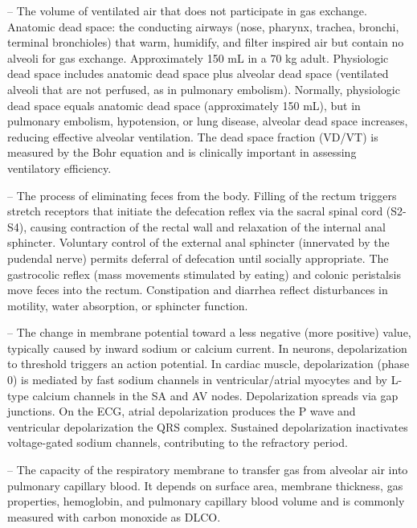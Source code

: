 -- The volume of ventilated air that does not participate in gas exchange. Anatomic dead space: the conducting airways (nose, pharynx, trachea, bronchi, terminal bronchioles) that warm, humidify, and filter inspired air but contain no alveoli for gas exchange. Approximately 150 mL in a 70 kg adult. Physiologic dead space includes anatomic dead space plus alveolar dead space (ventilated alveoli that are not perfused, as in pulmonary embolism). Normally, physiologic dead space equals anatomic dead space (approximately 150 mL), but in pulmonary embolism, hypotension, or lung disease, alveolar dead space increases, reducing effective alveolar ventilation. The dead space fraction (VD/VT) is measured by the Bohr equation and is clinically important in assessing ventilatory efficiency.

-- The process of eliminating feces from the body. Filling of the rectum triggers stretch receptors that initiate the defecation reflex via the sacral spinal cord (S2-S4), causing contraction of the rectal wall and relaxation of the internal anal sphincter. Voluntary control of the external anal sphincter (innervated by the pudendal nerve) permits deferral of defecation until socially appropriate. The gastrocolic reflex (mass movements stimulated by eating) and colonic peristalsis move feces into the rectum. Constipation and diarrhea reflect disturbances in motility, water absorption, or sphincter function.

-- The change in membrane potential toward a less negative (more positive) value, typically caused by inward sodium or calcium current. In neurons, depolarization to threshold triggers an action potential. In cardiac muscle, depolarization (phase 0) is mediated by fast sodium channels in ventricular/atrial myocytes and by L-type calcium channels in the SA and AV nodes. Depolarization spreads via gap junctions. On the ECG, atrial depolarization produces the P wave and ventricular depolarization the QRS complex. Sustained depolarization inactivates voltage-gated sodium channels, contributing to the refractory period.

-- The capacity of the respiratory membrane to transfer gas from alveolar air into pulmonary capillary blood. It depends on surface area, membrane thickness, gas properties, hemoglobin, and pulmonary capillary blood volume and is commonly measured with carbon monoxide as DLCO.

